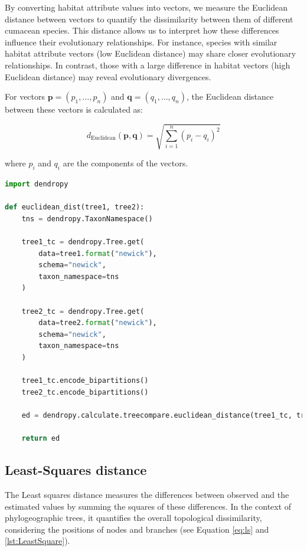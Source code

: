 By converting habitat attribute values into vectors, we measure the Euclidean distance between vectors to quantify the dissimilarity between them of different cumacean species. This distance allows us to interpret how these differences influence their evolutionary relationships. For instance, species with similar habitat attribute vectors (low Euclidean distance) may share closer evolutionary relationships. In contrast, those with a large difference in habitat vectors (high Euclidean distance) may reveal evolutionary divergences.

For vectors $\mathbf{p} = (p_1, \ldots, p_n)$ and $\mathbf{q} = (q_1, \ldots, q_n)$, the Euclidean distance between these vectors is calculated as:

\begin{equation}\label{eq:euclidean}
    d_{\text{Euclidean}}(\mathbf{p}, \mathbf{q}) = \sqrt{\sum_{i=1}^{n} (p_i - q_i)^2}
\end{equation}

where $p_i$ and $q_i$ are the components of the vectors.

\begin{lstlisting}[label=lst:euclideanDist,language=Python,caption=Python script for calculating the Euclidean distance using the ete3 package in the aPhyloGeo package]
import dendropy

def euclidean_dist(tree1, tree2):
    tns = dendropy.TaxonNamespace()

    tree1_tc = dendropy.Tree.get(
        data=tree1.format("newick"), 
        schema="newick", 
        taxon_namespace=tns
    )
    
    tree2_tc = dendropy.Tree.get(
        data=tree2.format("newick"), 
        schema="newick", 
        taxon_namespace=tns
    )

    tree1_tc.encode_bipartitions()
    tree2_tc.encode_bipartitions()

    ed = dendropy.calculate.treecompare.euclidean_distance(tree1_tc, tree2_tc)

    return ed
\end{lstlisting}

\subsection{Least-Squares distance}\label{LS}

The Least squares distance measures the differences between observed and the estimated values by summing the squares of these differences. In the context of phylogeographic trees, it quantifies the overall topological dissimilarity, considering the positions of nodes and branches (see Equation \eqref{eq:ls} and \autoref{lst:LeastSquare}).

